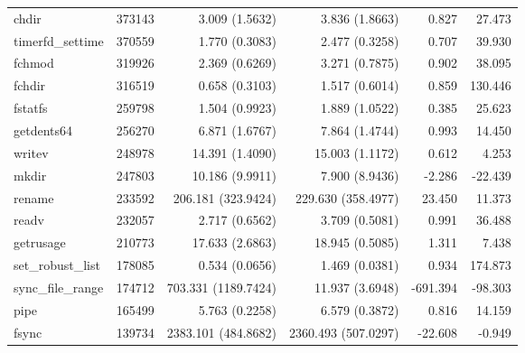 \begin{longtable}{>{\ttfamily}lrrrrr}
                          chdir &     373143 &              3.009 (1.5632) &            3.836 (1.8663) &           0.827 &       27.473 \\
               timerfd\_settime &     370559 &              1.770 (0.3083) &            2.477 (0.3258) &           0.707 &       39.930 \\
                         fchmod &     319926 &              2.369 (0.6269) &            3.271 (0.7875) &           0.902 &       38.095 \\
                         fchdir &     316519 &              0.658 (0.3103) &            1.517 (0.6014) &           0.859 &      130.446 \\
                        fstatfs &     259798 &              1.504 (0.9923) &            1.889 (1.0522) &           0.385 &       25.623 \\
                     getdents64 &     256270 &              6.871 (1.6767) &            7.864 (1.4744) &           0.993 &       14.450 \\
                         writev &     248978 &             14.391 (1.4090) &           15.003 (1.1172) &           0.612 &        4.253 \\
                          mkdir &     247803 &             10.186 (9.9911) &            7.900 (8.9436) &          -2.286 &      -22.439 \\
                         rename &     233592 &          206.181 (323.9424) &        229.630 (358.4977) &          23.450 &       11.373 \\
                          readv &     232057 &              2.717 (0.6562) &            3.709 (0.5081) &           0.991 &       36.488 \\
                      getrusage &     210773 &             17.633 (2.6863) &           18.945 (0.5085) &           1.311 &        7.438 \\
              set\_robust\_list &     178085 &              0.534 (0.0656) &            1.469 (0.0381) &           0.934 &      174.873 \\
              sync\_file\_range &     174712 &         703.331 (1189.7424) &           11.937 (3.6948) &        -691.394 &      -98.303 \\
                           pipe &     165499 &              5.763 (0.2258) &            6.579 (0.3872) &           0.816 &       14.159 \\
                          fsync &     139734 &         2383.101 (484.8682) &       2360.493 (507.0297) &         -22.608 &       -0.949 \\

\end{longtable}
